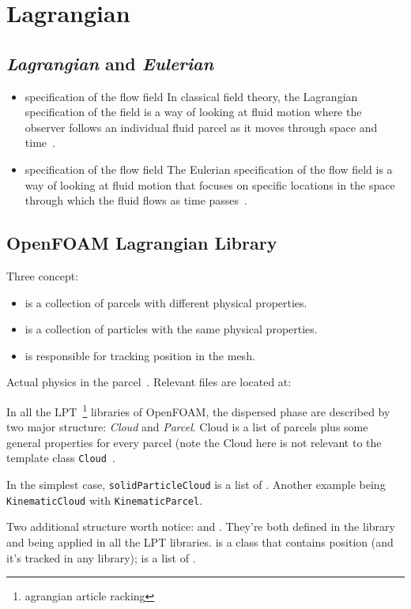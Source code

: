 \chapter{Lagrangian}

\section{\emph{Lagrangian} and \emph{Eulerian}}

\begin{itemize}
  \item {} specification of the flow field In classical field theory, the Lagrangian specification of the field is a way of looking at fluid motion where the observer follows an individual fluid parcel as it moves through space and time~\cite{Xu_2016,Batchelor_2000}.
  \item {} specification of the flow field The Eulerian specification of the flow field is a way of looking at fluid motion that focuses on specific locations in the space through which the fluid flows as time passes~\cite{Xu_2016}.
\end{itemize}


\section{OpenFOAM Lagrangian Library}



Three concept:
\begin{itemize}
  \item {} is a collection of parcels with different physical properties.
  \item {} is a collection of particles with the same physical properties.
  \item {} is responsible for tracking position in the mesh.
\end{itemize}
Actual physics in the parcel~\cite{Zaripov_2018}. Relevant files are located at:


In all the LPT~\footnote{agrangian article racking} libraries of OpenFOAM, the
dispersed phase are described by two major structure: \emph{Cloud} and \emph{Parcel}. Cloud is a
list of parcels plus some general properties for every parcel (note the Cloud here is not relevant
to the template class \texttt{Cloud}~\cite{Chen_2013}.

In the simplest case, \texttt{solidParticleCloud} is a list of . Another
example being \texttt{KinematicCloud} with \texttt{KinematicParcel}.~\cite{Chen_2013}

Two additional structure worth notice:  and . They're both defined in the
 library and being applied in all the LPT libraries.  is a class
that contains position (and it's tracked in any library);  is a list of
.~\cite{Chen_2013}


